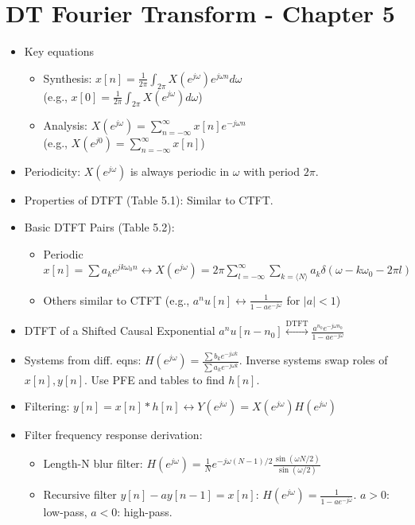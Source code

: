 \documentclass[10pt, twocolumn]{article}
\begin{document}
\section{DT Fourier Transform - Chapter 5}
\begin{itemize}
    \item Key equations
        \begin{itemize}
        \item Synthesis: $x[n] = \frac{1}{2\pi} \int_{2\pi} X(e^{j\omega})e^{j\omega n}d\omega$ \\
        (e.g., $x[0] = \frac{1}{2\pi} \int_{2\pi} X(e^{j\omega})d\omega$)
        \item Analysis: $X(e^{j\omega}) = \sum_{n=-\infty}^{\infty} x[n]e^{-j\omega n}$ \\
        (e.g., $X(e^{j0}) = \sum_{n=-\infty}^{\infty} x[n]$)
        \end{itemize}
    \item Periodicity: $X(e^{j\omega})$ is always periodic in $\omega$ with period $2\pi$.
    \item Properties of DTFT (Table 5.1): Similar to CTFT.
    \item Basic DTFT Pairs (Table 5.2):
        \begin{itemize}
        \item Periodic $x[n]=\sum a_k e^{jk\omega_0 n} \leftrightarrow X(e^{j\omega}) = 2\pi\sum_{l=-\infty}^\infty \sum_{k=\langle N \rangle} a_k \delta(\omega-k\omega_0 - 2\pi l)$
        \item Others similar to CTFT (e.g., $a^n u[n] \leftrightarrow \frac{1}{1-ae^{-j\omega}}$ for $|a|<1$)
        \end{itemize}
    \item DTFT of a Shifted Causal Exponential\newline
        $a^n u[n-n_0] \overset{\text{DTFT}}{\longleftrightarrow} \frac{a^{n_0} e^{-j\omega n_0}}{1-ae^{-j\omega}}$
    \item Systems from diff. eqns: $H(e^{j\omega}) = \frac{\sum b_k e^{-j\omega k}}{\sum a_k e^{-j\omega k}}$. Inverse systems swap roles of $x[n], y[n]$. Use PFE and tables to find $h[n]$.
    \item Filtering: $y[n]=x[n]*h[n] \leftrightarrow Y(e^{j\omega})=X(e^{j\omega})H(e^{j\omega})$
    \item Filter frequency response derivation:
        \begin{itemize}
        \item Length-N blur filter: $H(e^{j\omega}) = \frac{1}{N}e^{-j\omega(N-1)/2}\frac{\sin(\omega N/2)}{\sin(\omega/2)}$
        \item Recursive filter $y[n]-ay[n-1]=x[n]$: $H(e^{j\omega}) = \frac{1}{1-ae^{-j\omega}}$. $a>0$: low-pass, $a<0$: high-pass.
        \end{itemize}
\end{itemize}
\end{document}
